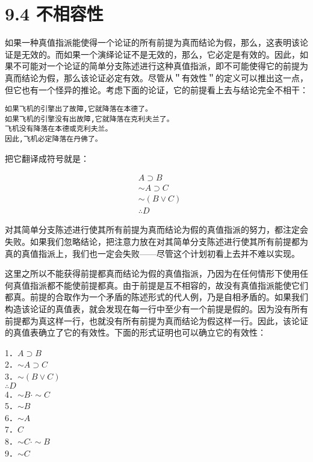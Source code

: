 \section*{9.4 不相容性}
如果一种真值指派能使得一个论证的所有前提为真而结论为假，那么，这表明该论证是无效的。而如果一个演绎论证不是无效的，那么，它必定是有效的。因此，如果不可能对一个论证的简单分支陈述进行这种真值指派，即不可能使得它的前提为真而结论为假，那么该论证必定有效。尽管从＂有效性＂的定义可以推出这一点，但它也有一个怪异的推论。考虑下面的论证，它的前提看上去与结论完全不相干：

\begin{verbatim}
如果飞机的引擎出了故障,它就降落在本德了。
如果飞机的引擎没有出故障,它就降落在克利夫兰了。
飞机没有降落在本德或克利夫兰。
因此,飞机必定降落在丹佛了。
\end{verbatim}

把它翻译成符号就是：

$$
\begin{aligned}
& A \supset B \\
& \sim A \supset C \\
& \sim(B \vee C) \\
& \therefore D
\end{aligned}
$$

对其简单分支陈述进行使其所有前提为真而结论为假的真值指派的努力，都注定会失败。如果我们忽略结论，把注意力放在对其简单分支陈述进行使其所有前提都为真的真值指派上，我们也一定会失败——尽管这个计划初看上去并不难以实现。

这里之所以不能获得前提都真而结论为假的真值指派，乃因为在任何情形下使用任何真值指派都不能使前提都真。由于前提是互不相容的，故没有真值指派能使它们都真。前提的合取作为一个矛盾的陈述形式的代人例，乃是自相矛盾的。如果我们构造该论证的真值表，就会发现在每一行中至少有一个前提是假的。因为没有所有前提都为真这样一行，也就没有所有前提为真而结论为假这样一行。因此，该论证的真值表确立了它的有效性。下面的形式证明也可以确立它的有效性：

1．$A \supset B$\\
2．$\sim A \supset C$\\
3．$\sim(B \vee C)$\\
$\therefore D$\\
4．$\sim B \cdot \sim C$\\
5．$\sim B$\\
6．$\sim A$\\
7．$C$\\
8．$\sim C \cdot \sim B$\\
9．$\sim C$

